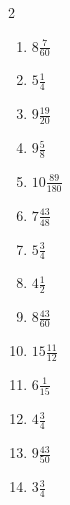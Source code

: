 \documentclass[12pt]{article}
\begin{document}
\begin{multicols}{2}
\begin{enumerate}
\item $ 8 \frac{7}{60} $
\item $ 5 \frac{1}{4} $
\item $ 9 \frac{19}{20} $
\item $ 9 \frac{5}{8} $
\item $ 10 \frac{89}{180} $
\item $ 7 \frac{43}{48} $
\item $ 5 \frac{3}{4} $
\item $ 4 \frac{1}{2} $
\item $ 8 \frac{43}{60} $
\item $ 15 \frac{11}{12} $
\item $ 6 \frac{1}{15} $
\item $ 4 \frac{3}{4} $
\item $ 9 \frac{43}{50} $
\item $ 3 \frac{3}{4} $
\end{enumerate}\end{multicols}\newpage
\end{document}
